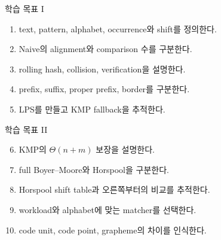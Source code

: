 \begin{frame}[plain]\vspace*{-8mm}\titlepage\end{frame}
\begin{frame}{학습 목표 I}
\small\begin{enumerate}
\item text, pattern, alphabet, occurrence와 shift를 정의한다.
\item Naive의 alignment와 comparison 수를 구분한다.
\item rolling hash, collision, verification을 설명한다.
\item prefix, suffix, proper prefix, border를 구분한다.
\item LPS를 만들고 KMP fallback을 추적한다.
\end{enumerate}
\end{frame}
\begin{frame}{학습 목표 II}
\small\begin{enumerate}\setcounter{enumi}{5}
\item KMP의 \(\Theta(n+m)\) 보장을 설명한다.
\item full Boyer--Moore와 Horspool을 구분한다.
\item Horspool shift table과 오른쪽부터의 비교를 추적한다.
\item workload와 alphabet에 맞는 matcher를 선택한다.
\item code unit, code point, grapheme의 차이를 인식한다.
\end{enumerate}
\end{frame}
